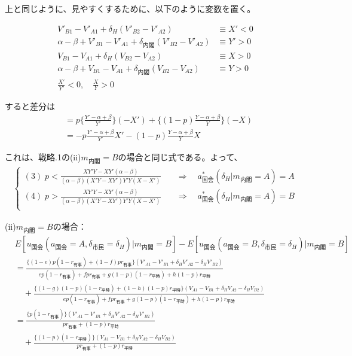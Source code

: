 \documentclass[main.tex]{subfiles}
\begin{document}
上と同じように、見やすくするために、以下のように変数を置く。

\begin{align*}
    V'_{B1} - V'_{A1} + \delta_H (V'_{B2} - V'_{A2}) &\equiv X' < 0\\
    \alpha-\beta + V'_{B1}-V'_{A1} + \delta_{内閣}(V'_{B2} - V'_{A2}) &\equiv Y' > 0\\
    V_{B1} - V_{A1} + \delta_H (V_{B2} - V_{A2}) &\equiv X > 0\\
    \alpha-\beta + V_{B1}-V_{A1} + \delta_{内閣}(V_{B2} - V_{A2}) &\equiv Y > 0\\[1em]
    \frac{X'}{Y'} < 0,\quad \frac{X}{Y} > 0
\end{align*}

すると差分は
\begin{align*}
    &= p\{ \frac{ Y'-\alpha + \beta }{ Y' } \}( -X' )  + \{(1-p) \frac{ Y-\alpha + \beta }{ Y } \}(-X )\\[1em]
    &= -p \frac{ Y' -\alpha + \beta }{ Y' } X'  -    (1-p) \frac{ Y  -\alpha + \beta }{ Y }X
\end{align*}

これは、戦略.1の(ii)$m_{内閣}=B$の場合と同じ式である。よって、
\begin{align*}
\begin{cases}
    (3)\; p  < \frac{XY'Y - XY'(\alpha - \beta)}{ (\alpha - \beta)( X'Y- XY')Y'Y(X - X') }   &\quad\Rightarrow\quad a^*_{国会}(\delta_H|m_{内閣} = A) = A\\[0.5em]
    (4)\; p  > \frac{XY'Y - XY'(\alpha - \beta)}{ (\alpha - \beta)( X'Y- XY')Y'Y(X - X') }  &\quad\Rightarrow\quad a^*_{国会}(\delta_H|m_{内閣} = A) = B\\[0.5em] 
 \end{cases}
\end{align*}


\bigskip
(ii)$m_{内閣}=B$の場合：
\begin{align*}
    & E[u_{国会}(a_{国会}=A, \delta_{市民}=\delta_H) | m_{内閣} = B  ] - E[u_{国会}(a_{国会}=B, \delta_{市民}=\delta_H) | m_{内閣} = B  ]\\[1em]
    &= \frac{ \{(1-e)p(1-r_{有事}) +  (1-f)pr_{有事}\}(V'_{A1} -V'_{B1} + \delta_H V'_{A2} - \delta_H V'_{B2})  }{ ep(1-r_{有事}) + fpr_{有事} + g(1-p)(1-r_{平時}) + h(1-p)r_{平時} }\\[1em]
    &\quad + \frac{ \{(1-g)(1-p)(1-r_{平時}) + (1-h)(1-p)r_{平時}\}(V_{A1} - V_{B1} + \delta_H V_{A2} - \delta_H V_{B2} ) }{ ep(1-r_{有事}) + fpr_{有事} + g(1-p)(1-r_{平時}) + h(1-p)r_{平時} }\\[1em]
    &= \frac{ \{p(1-r_{有事}) \}(V'_{A1} -V'_{B1} + \delta_H V'_{A2} - \delta_H V'_{B2})  }{ pr_{有事} +(1-p)r_{平時} }\\[1em]
    &\quad + \frac{ \{(1-p)(1-r_{平時}) \}(V_{A1} - V_{B1} + \delta_H V_{A2} - \delta_H V_{B2} ) }{ pr_{有事} + (1-p)r_{平時} }
\end{align*}
\end{document}
